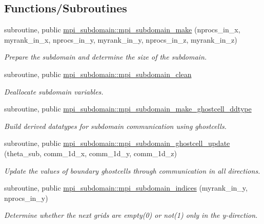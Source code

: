 \subsection*{Functions/\+Subroutines}
\begin{DoxyCompactItemize}
\item 
subroutine, public \mbox{\hyperlink{namespacempi__subdomain_a3a1e7cf64aafbebd3c09b92fc56bd311}{mpi\+\_\+subdomain\+::mpi\+\_\+subdomain\+\_\+make}} (nprocs\+\_\+in\+\_\+x, myrank\+\_\+in\+\_\+x, nprocs\+\_\+in\+\_\+y, myrank\+\_\+in\+\_\+y, nprocs\+\_\+in\+\_\+z, myrank\+\_\+in\+\_\+z)
\begin{DoxyCompactList}\small\item\em Prepare the subdomain and determine the size of the subdomain. \end{DoxyCompactList}\item 
subroutine, public \mbox{\hyperlink{namespacempi__subdomain_a56e9f2afd59e45fcada0f1c21a90eefe}{mpi\+\_\+subdomain\+::mpi\+\_\+subdomain\+\_\+clean}}
\begin{DoxyCompactList}\small\item\em Deallocate subdomain variables. \end{DoxyCompactList}\item 
subroutine, public \mbox{\hyperlink{namespacempi__subdomain_ad788c273d92ea7058caf0874bffdad6d}{mpi\+\_\+subdomain\+::mpi\+\_\+subdomain\+\_\+make\+\_\+ghostcell\+\_\+ddtype}}
\begin{DoxyCompactList}\small\item\em Build derived datatypes for subdomain communication using ghostcells. \end{DoxyCompactList}\item 
subroutine, public \mbox{\hyperlink{namespacempi__subdomain_a2e34a77537009dd448375e8fdc8d5b62}{mpi\+\_\+subdomain\+::mpi\+\_\+subdomain\+\_\+ghostcell\+\_\+update}} (theta\+\_\+sub, comm\+\_\+1d\+\_\+x, comm\+\_\+1d\+\_\+y, comm\+\_\+1d\+\_\+z)
\begin{DoxyCompactList}\small\item\em Update the values of boundary ghostcells through communication in all directions. \end{DoxyCompactList}\item 
subroutine, public \mbox{\hyperlink{namespacempi__subdomain_afe948dc18da021f2448cf9a6265155fe}{mpi\+\_\+subdomain\+::mpi\+\_\+subdomain\+\_\+indices}} (myrank\+\_\+in\+\_\+y, nprocs\+\_\+in\+\_\+y)
\begin{DoxyCompactList}\small\item\em Determine whether the next grids are empty(0) or not(1) only in the y-\/direction. \end{DoxyCompactList}\item 

\end{DoxyCompactItemize}
